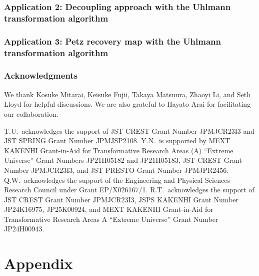 \documentclass[superscriptaddress,11pt,bibliography]{article}
\theoremstyle{definition}
\theoremstyle{definition}
\begin{document}
\section{Application 2: Decoupling approach with the Uhlmann transformation algorithm}
\label{sec:decoupling and uhlmann}


\section{Application 3: Petz recovery map with the Uhlmann transformation algorithm}
\label{sec:sample petz}






\section*{Acknowledgments}
We thank Kosuke Mitarai, Keisuke Fujii, Takaya Matsuura, Zhaoyi Li, and Seth Lloyd for helpful discussions. We are also grateful to Hayato Arai for facilitating our collaboration.

T.U.\ acknowledges the support of JST CREST Grant Number JPMJCR23I3 and JST SPRING Grant Number JPMJSP2108.
Y.N.\ is supported by MEXT KAKENHI Grant-in-Aid for Transformative Research Areas (A) ``Extreme Universe'' Grant Numbers JP21H05182 and JP21H05183, JST CREST Grant Number JPMJCR23I3, and JST PRESTO Grant Number JPMJPR2456.
Q.W.\ acknowledges the support of the Engineering and Physical Sciences Research Council under Grant \mbox{EP/X026167/1}.
R.T.\ acknowledges the support of JST CREST Grant Number JPMJCR23I3, JSPS KAKENHI Grant Number JP24K16975, JP25K00924, and MEXT KAKENHI Grant-in-Aid for Transformative
Research Areas A ``Extreme Universe” Grant Number JP24H00943.











\appendix
\part*{\LARGE Appendix}









\end{document}
